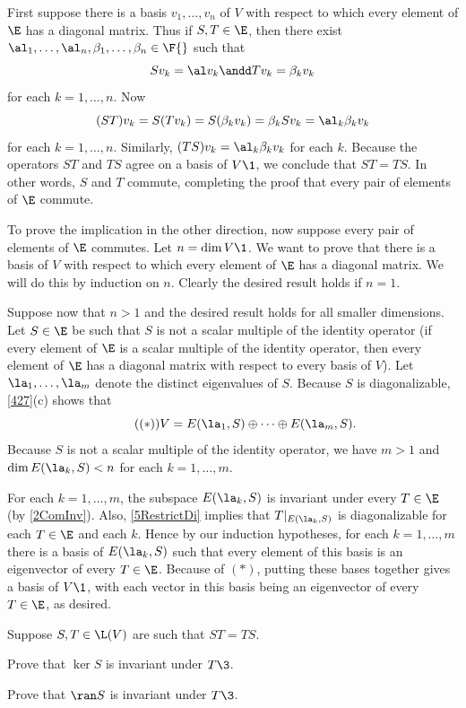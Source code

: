 \begin{Solution}
First suppose there is a basis $v_1, \ldots, v_n$ of $V$ with respect to which every element of $\E$ has a diagonal matrix. Thus if $S, T \in \E$, then there exist
$\al_1, \ldots, \al_n, \beta_1, \ldots, \beta_n \in \F{}$ such that
\[
Sv_k = \al v_k \andd Tv_k = \beta_k v_k
\]
for each $k = 1, \ldots, n$. Now
\[
(ST)v_k = S(Tv_k) = S(\beta_k v_k) = \beta_k Sv_k = \al_k \beta_k v_k
\]
for each $k = 1, \ldots, n$. Similarly, $(TS)v_k = \al_k \beta_k v_k$ for each $k$. Because the operators $ST$ and $TS$ agree on a basis of $V\1$, we conclude that $ST = TS$. In other words, $S$ and $T$ commute, completing the proof that every pair of elements of $\E$ commute.

To prove the implication in the other direction, now suppose every pair of elements of $\E$ commutes. Let $n = \dim V\1$. We want to prove that there is a basis of $V$ with respect to which every element of $\E$ has a diagonal matrix. We will do this by induction on $n$. Clearly the desired result holds if $n = 1$.

Suppose now that $n > 1$ and the desired result holds for all smaller dimensions. Let $S \in \E$ be such that $S$ is not a scalar multiple of the identity operator (if every element of $\E$ is a scalar multiple of the identity operator, then every element of $\E$ has a diagonal matrix with respect to every basis of $V$). Let $\la_1, \ldots, \la_m$ denote the distinct eigenvalues of $S$. Because $S$ is diagonalizable, \ref{427}(c) shows that
\[ \tag{$(*)$}
V = E(\la_1, S) \oplus \cdots \oplus E(\la_m, S).
\]
Because $S$ is not a scalar multiple of the identity operator, we have $m > 1$ and $\dim E(\la_k, S) < n$ for each $k = 1, \ldots, m$.

For each $k = 1, \ldots, m$, the subspace  $E(\la_k, S)$ is invariant under every $T \in \E$ (by \ref{2ComInv}). Also, \ref{5RestrictDi} implies that $T|_{E(\la_k, S)}$ is diagonalizable for each $T \in \E$ and each $k$. Hence by our induction hypotheses, for each $k = 1, \ldots, m$ there is a basis of $E(\la_k, S)$ such that every element of this basis is an eigenvector of every $T \in \E$. Because of $(*)$, putting these bases together gives a basis of $V\1$, with each vector in this basis being an eigenvector of every $T \in \E$, as desired.
\end{Solution}

\exercise
Suppose $S, T \in \L(V)$ are such that $ST = TS$.
\begin{subtheorem}
\item
Prove that $\ker S$ is invariant under $T\3$.
\item
Prove that $\ran S$ is invariant under $T\3$.
\end{subtheorem}

